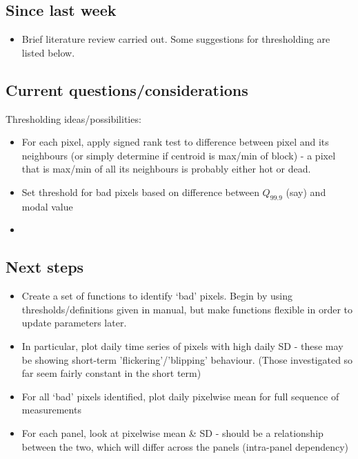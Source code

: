 \documentclass[10pt,fleqn]{article}
\begin{document}
\subsection*{Since last week}

\begin{itemize}

\item
Brief literature review carried out. Some suggestions for thresholding are listed below.

\end{itemize}

\subsection*{Current questions/considerations}

Thresholding ideas/possibilities:

\begin{itemize}
\item
For each pixel, apply signed rank test to difference between pixel and its neighbours (or simply determine if centroid is max/min of block) - a pixel that is max/min of all its neighbours is probably either hot or dead.

\item
Set threshold for bad pixels based on difference between $Q_{99.9}$ (say) and modal value

\item
\end{itemize}

\subsection*{Next steps}

\begin{itemize}

\item
Create a set of functions to identify `bad' pixels. Begin by using thresholds/definitions given in manual, but make functions flexible in order to update parameters later.

\item
In particular, plot daily time series of pixels with high daily SD - these may be showing short-term 'flickering'/'blipping' behaviour. (Those investigated so far seem fairly constant in the short term)

\item
For all `bad' pixels identified, plot daily pixelwise mean for full sequence of measurements

\item
For each panel, look at pixelwise mean \& SD - should be a relationship between the two, which will differ across the panels (intra-panel dependency)


\end{itemize}

\end{document}
